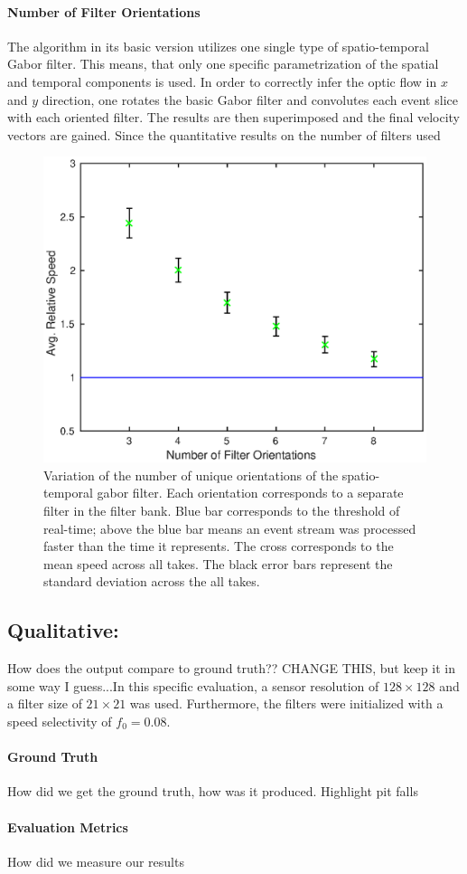 \paragraph{Number of Filter Orientations}
The algorithm in its basic version utilizes one single type of spatio-temporal Gabor filter.
This means, that only one specific parametrization of the spatial and temporal components is used.
In order to correctly infer the optic flow in $x$ and $y$ direction, one rotates the basic Gabor filter and convolutes each event slice with each oriented filter.
The results are then superimposed and the final velocity vectors are gained.
Since the quantitative results on the number of filters used
\begin{figure}[!htb]
	\centering
	\includegraphics[scale=.9]{gpu_fo.eps}
	\caption{Variation of the number of unique orientations of the spatio-temporal gabor filter. Each orientation corresponds to a separate filter in the filter bank. Blue bar corresponds to the threshold of real-time; above the blue bar means an event stream was processed faster than the time it represents. The cross corresponds to the mean speed across all takes. The black error bars represent the standard deviation across the all takes.}
	\label{fig:gpu_fo}
\end{figure}

\subsection{Qualitative:} How does the output compare to ground truth??
CHANGE THIS, but keep it in some way I guess...In this specific evaluation, a sensor resolution of $128\times128$ and a filter size of $21\times21$ was used.
Furthermore, the filters were initialized with a speed selectivity of $f_0=0.08$.
\paragraph{Ground Truth}
How did we get the ground truth, how was it produced. Highlight pit falls
\paragraph{Evaluation Metrics}
How did we measure our results
